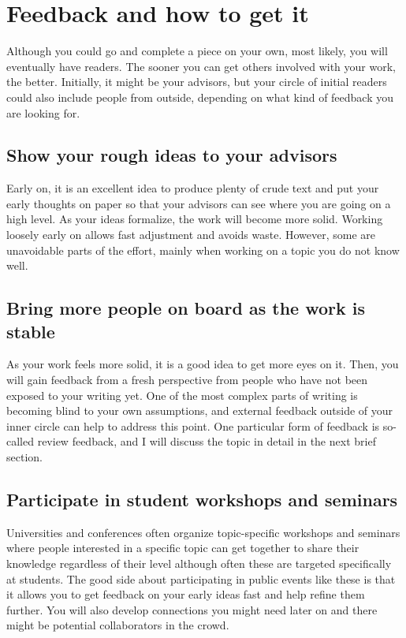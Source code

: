 \section{Feedback and how to get it}

Although you could go and complete a piece on your own, most likely, you will eventually have readers.
The sooner you can get others involved with your work, the better.
Initially, it might be your advisors, but your circle of initial readers could also include people from outside, depending on what kind of feedback you are looking for.

\subsection{Show your rough ideas to your advisors}

Early on, it is an excellent idea to produce plenty of crude text and put your early thoughts on paper so that your advisors can see where you are going on a high level.
As your ideas formalize, the work will become more solid.
Working loosely early on allows fast adjustment and avoids waste. However, some are unavoidable parts of the effort, mainly when working on a topic you do not know well.

\subsection{Bring more people on board as the work is stable}

As your work feels more solid, it is a good idea to get more eyes on it.
Then, you will gain feedback from a fresh perspective from people who have not been exposed to your writing yet.
One of the most complex parts of writing is becoming blind to your own assumptions, and external feedback outside of your inner circle can help to address this point.
One particular form of feedback is so-called review feedback, and I will discuss the topic in detail in the next brief section.

\subsection{Participate in student workshops and seminars}

Universities and conferences often organize topic-specific workshops and seminars where people interested in a specific topic can get together to share their knowledge regardless of their level although often these are targeted specifically at students.
The good side about participating in public events like these is that it allows you to get feedback on your early ideas fast and help refine them further.
You will also develop connections you might need later on and there might be potential collaborators in the crowd.


